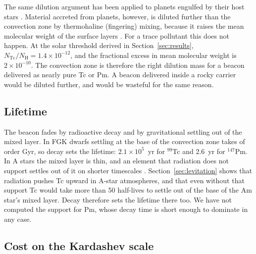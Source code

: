 \documentclass[final,5p]{elsarticle}
\begin{document}
The same dilution argument has been applied to planets engulfed by their host stars \citep{Laughlin1997, Pinsonneault2001}. Material accreted from planets, however, is diluted further than the convection zone by thermohaline (fingering) mixing, because it raises the mean molecular weight of the surface layers \citep{Vauclair2004, Garaud2011, Theado2012}. For a trace pollutant this does not happen. At the solar threshold derived in Section~\ref{sec:results}, $N_\mathrm{Tc}/N_\mathrm{H} = 1.4\times10^{-12}$, and the fractional excess in mean molecular weight is $2\times10^{-10}$. The convection zone is therefore the right dilution mass for a beacon delivered as nearly pure Tc or Pm. A beacon delivered inside a rocky carrier would be diluted further, and would be wasteful for the same reason.

\subsection{Lifetime}
\label{sec:lifetime}

The beacon fades by radioactive decay and by gravitational settling out of the mixed layer. In FGK dwarfs settling at the base of the convection zone takes of order Gyr, so decay sets the lifetime: $2.1\times10^{5}$~yr for $^{99}$Tc and 2.6~yr for $^{147}$Pm. In A stars the mixed layer is thin, and an element that radiation does not support settles out of it on shorter timescales \citep{Vick2010}. Section~\ref{sec:levitation} shows that radiation pushes Tc upward in A-star atmospheres, and that even without that support Tc would take more than 50 half-lives to settle out of the base of the Am star's mixed layer. Decay therefore sets the lifetime there too. We have not computed the support for Pm, whose decay time is short enough to dominate in any case.

\subsection{Cost on the Kardashev scale}
\label{sec:upkeep}
\end{document}

